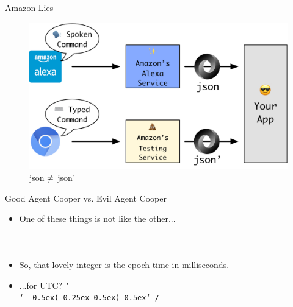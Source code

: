 \documentclass[10pt]{beamer}
\def\shrug{\texttt{\raisebox{0.75em}{\char`\_}\char`\\\char`\_\kern-0.5ex(\kern-0.25ex\raisebox{0.25ex}{\rotatebox{45}{\raisebox{-.75ex}"\kern-1.5ex\rotatebox{-90})}}\kern-0.5ex)\kern-0.5ex\char`\_/\raisebox{0.75em}{\char`\_}}}
\begin{document}
\begin{frame}{Amazon Lies}
\begin{center}
	\begin{figure}
		\centering
		\includegraphics[width=\textwidth]{./images/alexa-flow-02.png}
		\caption{json $\protect\neq$ json'}
	\end{figure}
\end{center}
\end{frame}

\begin{frame}{Good Agent Cooper vs. Evil Agent Cooper}
	\begin{itemize}
		\item One of these things is not like the other...
	\end{itemize}
	\begin{columns}
		\begin{column}{0.5 \textwidth}
			\inputminted[fontsize=\small,frame=single,framesep=2mm,linenos=false,breaklines]{javascript}{src/good.json}
		\end{column}
		\begin{column}{0.5 \textwidth}
			\inputminted[fontsize=\small,frame=single,framesep=2mm,linenos=true,breaklines]{javascript}{src/bad.json}
		\end{column}
	\end{columns}
	\begin{itemize}
		\item So, that lovely integer is the epoch time in milliseconds.
		\item ...for UTC? \shrug
	\end{itemize}
\end{frame}
\end{document}
